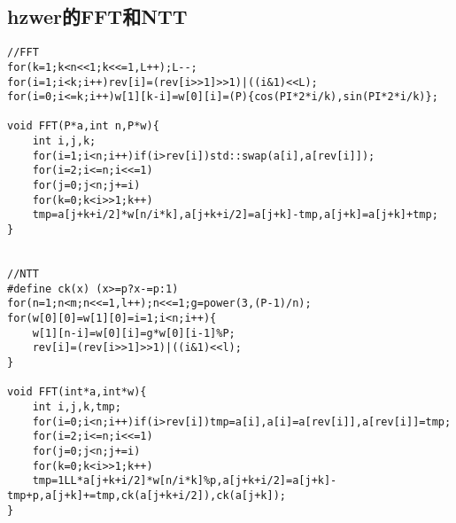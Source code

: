 \documentclass{article}
\begin{document}
\subsection{hzwer的FFT和NTT}
\begin{lstlisting}
//FFT
for(k=1;k<n<<1;k<<=1,L++);L--;
for(i=1;i<k;i++)rev[i]=(rev[i>>1]>>1)|((i&1)<<L);
for(i=0;i<=k;i++)w[1][k-i]=w[0][i]=(P){cos(PI*2*i/k),sin(PI*2*i/k)};

void FFT(P*a,int n,P*w){
	int i,j,k;
	for(i=1;i<n;i++)if(i>rev[i])std::swap(a[i],a[rev[i]]);
	for(i=2;i<=n;i<<=1)
	for(j=0;j<n;j+=i)
	for(k=0;k<i>>1;k++)
	tmp=a[j+k+i/2]*w[n/i*k],a[j+k+i/2]=a[j+k]-tmp,a[j+k]=a[j+k]+tmp;
}


//NTT
#define ck(x) (x>=p?x-=p:1)
for(n=1;n<m;n<<=1,l++);n<<=1;g=power(3,(P-1)/n);
for(w[0][0]=w[1][0]=i=1;i<n;i++){
	w[1][n-i]=w[0][i]=g*w[0][i-1]%P;
	rev[i]=(rev[i>>1]>>1)|((i&1)<<l);
}

void FFT(int*a,int*w){
	int i,j,k,tmp;
	for(i=0;i<n;i++)if(i>rev[i])tmp=a[i],a[i]=a[rev[i]],a[rev[i]]=tmp;
	for(i=2;i<=n;i<<=1)
	for(j=0;j<n;j+=i)
	for(k=0;k<i>>1;k++)
	tmp=1LL*a[j+k+i/2]*w[n/i*k]%p,a[j+k+i/2]=a[j+k]-tmp+p,a[j+k]+=tmp,ck(a[j+k+i/2]),ck(a[j+k]);
}
\end{lstlisting}
\end{document}
